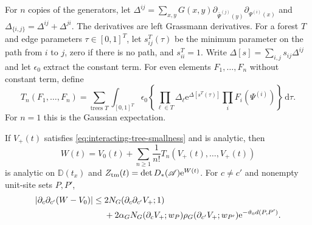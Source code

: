 \documentclass[11pt,letterpaper,reqno]{amsart}
\newcommand{\dd}{\mathrm d}
\begin{document}
For $n$ copies of the generators, let
$\Delta^{ij}=\sum_{x,y}G(x,y)
\partial_{\bar\Psi^{(j)}(y)}\partial_{\Psi^{(i)}(x)}$
and $\Delta_{\{i,j\}}=\Delta^{ij}+\Delta^{ji}$.
The derivatives are left Grassmann derivatives.
For a forest $T$ and edge parameters
$\tau\in[0,1]^T$, let $s_{ij}^T(\tau)$ be the
minimum parameter on the path from $i$ to $j$,
zero if there is no path, and $s_{ii}^T=1$.
Write $\Delta[s]=\sum_{i,j}s_{ij}\Delta^{ij}$
and let $\epsilon_0$ extract the constant term.
For even elements $F_1,\ldots,F_n$ without
constant term, define
\begin{equation}\label{eq:interacting-connected-tree}
 T_n(F_1,\ldots,F_n)=
 \sum_{\text{trees }T}\int_{[0,1]^T}
 \epsilon_0\left\{\prod_{\ell\in T}\Delta_\ell
          \mathrm e^{\Delta[s^T(\tau)]}\prod_iF_i(\Psi^{(i)})\right\}\,\dd\tau .
\end{equation}
For $n=1$ this is the Gaussian expectation.

\begin{proposition}\label{prop:interacting-tree-log}
If $V_+(t)$ satisfies
\eqref{eq:interacting-tree-smallness} and is analytic,
then
\[
 W(t)=V_0(t)+\sum_{n\ge1}\frac1{n!}
                       T_n(V_+(t),\ldots,V_+(t))
\]
is analytic on $\mathbb D(t_x)$ and
$Z_{\rm tm}(t)=\det D_*(\mathscr A)\mathrm e^{W(t)}$.
For $c\ne c'$ and nonempty unit-site sets $P,P'$,
\begin{align}
 |\partial_c\partial_{c'}(W-V_0)|
 \le{}&2N_G(\partial_c\partial_{c'}V_+;1)\notag\\
 &+2\alpha_GN_G(\partial_cV_+;w_P)
       \rho_G(\partial_{c'}V_+;w_{P'})
                                  \mathrm e^{-\vartheta_0d(P,P')}.
                                  \label{eq:interacting-tree-mixed}
\end{align}
\end{proposition}
\end{document}
